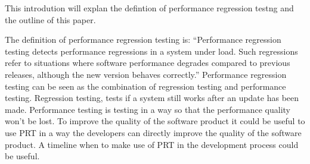 This introdution will explan the defintion of performance regression testng and the outline of this paper. \newline \newline


The definition of performance regression testing is: ``Performance regression testing detects performance
regressions in a system under load. Such regressions refer to
situations where software performance degrades compared to
previous releases, although the new version behaves correctly.''\cite{Definition}
Performance regression testing can be seen as the combination of regression testing and performance testing. Regression testing, tests if a system still works after an update has been made. Performance testing is testing in a way so that the performance quality won't be lost. 
To improve the quality of the software product it could be useful to use PRT in a way the developers can
directly improve the quality of the software product. A timeline when to make use of PRT in the development
process could be useful.
